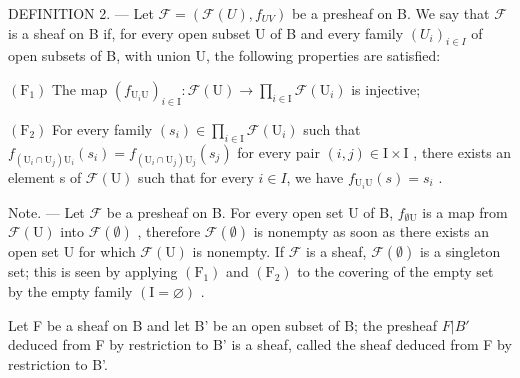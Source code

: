 DEFINITION 2. --- Let \(\mathcal{F} = (\mathcal{F}(U), f_{UV})\) be a presheaf on B. We say that \(\mathcal{F}\) is a sheaf on B if, for every open subset U of B and every family \((U_i)_{i \in I}\) of open subsets of B, with union U, the following properties are satisfied:

\((\mathrm{F}_{1})\) The map \((f_{\mathrm{U}_{i}\mathrm{U}})_{i\in\mathrm{I}}\colon\mathcal{F}(\mathrm{U})\to\prod_{i\in\mathrm{I}}\mathcal{F}(\mathrm{U}_{i})\) is injective;

\((\mathrm{F}_{2})\) For every family \((s_{i}) \in \prod_{i \in \mathrm{I}} \mathcal{F}(\mathrm{U}_{i})\) such that \(f_{(\mathrm{U}_{i} \cap \mathrm{U}_{j})\mathrm{U}_{i}}(s_{i}) = f_{(\mathrm{U}_{i} \cap \mathrm{U}_{j})\mathrm{U}_{j}}(s_{j})\) for every pair \((i, j) \in \mathrm{I} \times \mathrm{I}\) , there exists an element s of \(\mathcal{F}(\mathrm{U})\) such that for every \(i \in I\), we have \(f_{\mathrm{U}_{i}\mathrm{U}}(s) = s_{i}\) .

Note. --- Let \(\mathcal{F}\) be a presheaf on B. For every open set U of B, \(f_{\emptyset \mathrm{U}}\) is a map from \(\mathcal{F}(\mathrm{U})\) into \(\mathcal{F}(\emptyset)\) , therefore \(\mathcal{F}(\emptyset)\) is nonempty as soon as there exists an open set U for which \(\mathcal{F}(\mathrm{U})\) is nonempty. If \(\mathcal{F}\) is a sheaf, \(\mathcal{F}(\emptyset)\) is a singleton set; this is seen by applying \((\mathrm{F}_{1})\) and \((\mathrm{F}_{2})\) to the covering of the empty set by the empty family \((\mathrm{I}=\varnothing)\) .

Let F be a sheaf on B and let B' be an open subset of B; the presheaf \(F|B'\) deduced from F by restriction to B' is a sheaf, called the sheaf deduced from F by restriction to B'.


